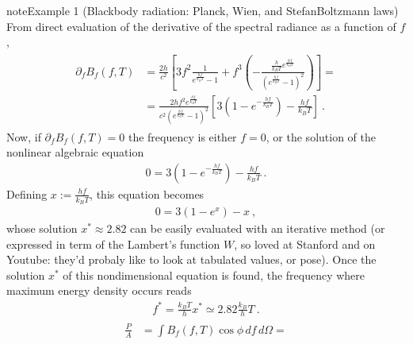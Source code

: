 \documentclass[letterpaper,10pt,english]{jupyterBook}
\begin{document}
\begin{sphinxadmonition}{note}{Example 1 (Black\sphinxhyphen{}body radiation: Planck, Wien, and Stefan\sphinxhyphen{}Boltzmann laws)}
\sphinxAtStartPar
From direct evaluation of the derivative of the spectral radiance as a function of \(f\),
\begin{equation*}
\begin{split}\begin{aligned}
  \partial_f B_{f}(f,T)
  & = \frac{2 h}{c^2} \left[ 3 f^2 \frac{1}{e^{\frac{hf}{k_B T}}-1} + f^3 \left(-\frac{\frac{h}{k_B T} e^{\frac{hf}{k_B T}}}{\left( e^{\frac{hf}{k_B T}} - 1 \right)^2}  \right) \right] = \\
  & = \frac{2 h f^2 e^{\frac{hf}{k_B T}}}{c^2 \left( e^{\frac{hf}{k_B T}} - 1 \right)^2} \left[ 3 \left( 1 - e^{-\frac{hf}{k_B T}} \right) - \frac{h f}{k_B T}  \right] \ .
\end{aligned}\end{split}
\end{equation*}
\sphinxAtStartPar
Now, if \(\partial_f B_{f}(f,T) = 0\) the frequency is either \(f = 0\), or the solution of the nonlinear algebraic equation
\begin{equation*}
\begin{split}0 = 3 \left(1 - e^{-\frac{h f}{k_B T}} \right) - \frac{hf}{k_B T} \ .\end{split}
\end{equation*}
\sphinxAtStartPar
Defining \(x := \frac{h f}{k_B T}\), this equation becomes
\begin{equation*}
\begin{split}0 = 3 (1 - e^x) - x \ ,\end{split}
\end{equation*}
\sphinxAtStartPar
whose solution \(x^* \approx 2.82\) can be easily evaluated with an iterative method (or expressed in term of the Lambert’s function \(W\), so loved at Stanford and on Youtube: they’d probaly like to look at tabulated values, or pose). Once the solution \(x^*\) of this non\sphinxhyphen{}dimensional equation is found, the frequency where maximum energy density occurs reads
\begin{equation*}
\begin{split}f^* = \frac{k_B T}{h} x^* \simeq 2.82 \frac{k_B}{h} T \ .\end{split}
\end{equation*}
\sphinxAtStartPar
{}
\begin{equation*}
\begin{split}\begin{aligned}
  \frac{P}{A} 
  & = \int B_{f}(f,T) \cos \phi \, df \, d\Omega = \\

\end{aligned}
\end{split}
\end{equation*}
\end{sphinxadmonition}
\end{document}
